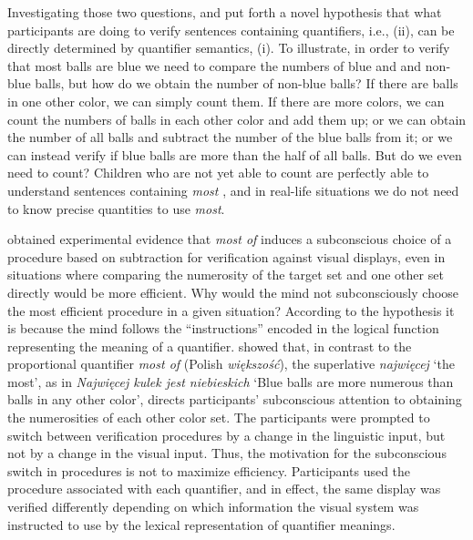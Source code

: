 \documentclass[output=paper]{langscibook}
\begin{document}
Investigating those two questions, \citet{pietroski2009meaning} and \citet{lidz2011interface} put forth a novel hypothesis that what
participants are doing to verify sentences containing quantifiers, i.e., (ii), can be directly determined by quantifier
semantics, (i). To illustrate, in order to verify that most balls are blue we need to compare the numbers of
blue and and non-blue balls, but how do we obtain the number of non-blue balls? If there are balls in one other color,
we can simply count them. If there are more colors, we can count the numbers of balls in each other color and add them
up; or we can obtain the number of all balls and subtract the number of the blue balls from it; or we can instead
verify if blue balls are more than the half of all balls. But do we even need to count? Children who are not yet able
to count are perfectly able to understand sentences containing \textit{most} \citep{halberda2008development,odic2018individuals}, and in real-life situations we do not need to know precise quantities to use \textit{most}.\largerpage

\citet{pietroski2009meaning, bates2015parsimonious, tomaszewicz2011verification, tomaszewicz2012semantics, tomaszewicz2013linguistic, tomaszewicz2018focus, hunter2017verification, Knowlton2021} obtained experimental evidence that \textit{most of} induces a subconscious choice of a procedure based on subtraction for
verification against visual displays, even in situations where comparing the numerosity of the target set and one other
set directly would be more efficient. Why would the mind not subconsciously choose the most efficient procedure in a
given situation? According to the hypothesis it is because the mind follows the “instructions” encoded in the logical
function representing the meaning of a quantifier. \citet{tomaszewicz2011verification, tomaszewicz2012semantics, tomaszewicz2013linguistic, tomaszewicz2018focus} showed that, in contrast to the proportional quantifier \textit{most of} (Polish \textit{większość}), the superlative \textit{najwięcej} `the most',
as in \textit{Najwięcej kulek jest niebieskich} `Blue balls are more numerous than balls in any other color', directs
participants’ subconscious attention to obtaining the numerosities of each other color set. The participants were
prompted to switch between verification procedures by a change in the linguistic input, but not by a change in the
visual input. Thus, the motivation for the subconscious switch in procedures is not to maximize efficiency.
Participants used the procedure associated with each quantifier, and in effect, the same display was verified
differently depending on which information the visual system was instructed to use by the lexical representation of
quantifier meanings.
\end{document}
